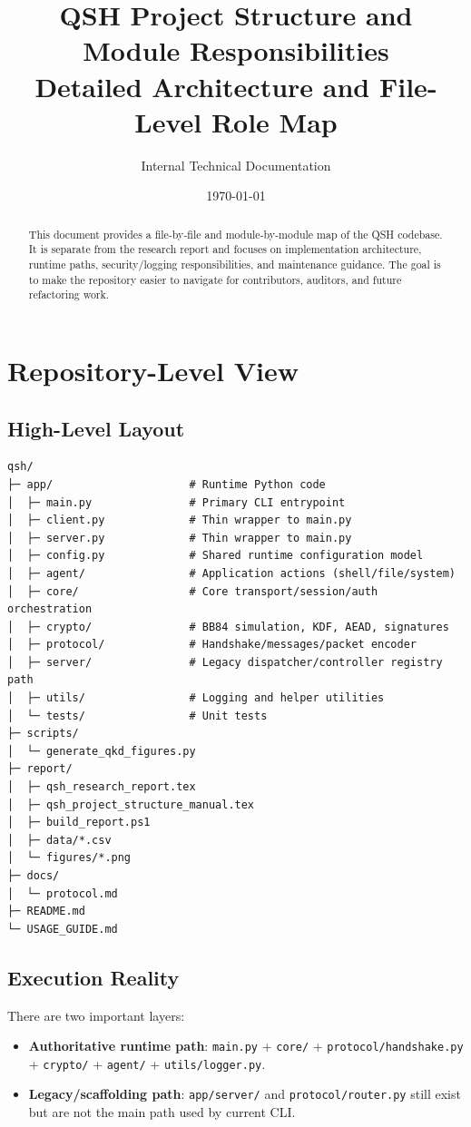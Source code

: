 \documentclass[11pt,a4paper]{article}
\title{\textbf{QSH Project Structure and Module Responsibilities}\\
\large Detailed Architecture and File-Level Role Map}
\author{Internal Technical Documentation}
\date{\today}
\begin{document}
\maketitle

\begin{abstract}
This document provides a file-by-file and module-by-module map of the QSH codebase. It is separate from the research report and focuses on implementation architecture, runtime paths, security/logging responsibilities, and maintenance guidance. The goal is to make the repository easier to navigate for contributors, auditors, and future refactoring work.
\end{abstract}

\tableofcontents
\newpage

\section{Repository-Level View}

\subsection{High-Level Layout}
\begin{lstlisting}
qsh/
├─ app/                     # Runtime Python code
│  ├─ main.py               # Primary CLI entrypoint
│  ├─ client.py             # Thin wrapper to main.py
│  ├─ server.py             # Thin wrapper to main.py
│  ├─ config.py             # Shared runtime configuration model
│  ├─ agent/                # Application actions (shell/file/system)
│  ├─ core/                 # Core transport/session/auth orchestration
│  ├─ crypto/               # BB84 simulation, KDF, AEAD, signatures
│  ├─ protocol/             # Handshake/messages/packet encoder
│  ├─ server/               # Legacy dispatcher/controller registry path
│  ├─ utils/                # Logging and helper utilities
│  └─ tests/                # Unit tests
├─ scripts/
│  └─ generate_qkd_figures.py
├─ report/
│  ├─ qsh_research_report.tex
│  ├─ qsh_project_structure_manual.tex
│  ├─ build_report.ps1
│  ├─ data/*.csv
│  └─ figures/*.png
├─ docs/
│  └─ protocol.md
├─ README.md
└─ USAGE_GUIDE.md
\end{lstlisting}

\subsection{Execution Reality}
There are two important layers:
\begin{itemize}[leftmargin=1.4em]
  \item \textbf{Authoritative runtime path}: \texttt{main.py} + \texttt{core/} + \texttt{protocol/handshake.py} + \texttt{crypto/} + \texttt{agent/} + \texttt{utils/logger.py}.
  \item \textbf{Legacy/scaffolding path}: \texttt{app/server/} and \texttt{protocol/router.py} still exist but are not the main path used by current CLI.
\end{itemize}
\end{document}
